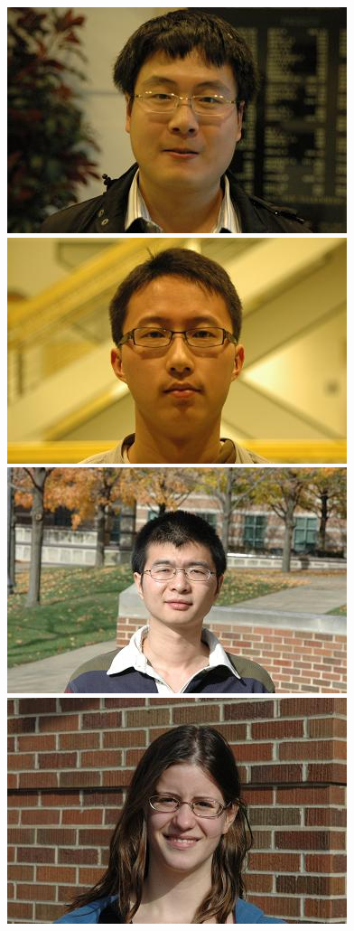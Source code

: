 \documentclass[12pt,journal,draftcls,letterpaper,onecolumn]{IEEEtran}
\begin{document}
\begin{figure}
\vspace{2mm}
\centering
\includegraphics[scale=0.75,clip=true]{figures_pami/uiuc_example/glasses/DSC_1397.JPG}
\includegraphics[scale=0.75,clip=true]{figures_pami/uiuc_example/glasses/DSC_1532.JPG}
\includegraphics[scale=0.75,clip=true]{figures_pami/uiuc_example/glasses/DSC_1556.JPG}
\includegraphics[scale=0.75,clip=true]{figures_pami/uiuc_example/glasses/DSC_1585.JPG}

\end{figure}
\end{document}
